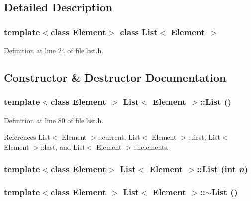 \subsection{Detailed Description}
\subsubsection*{template$<$class Element$>$ class List$<$ Element $>$}



Definition at line 24 of file list.h.

\subsection{Constructor \& Destructor Documentation}
\hypertarget{classList_cdfa9a2a43d22f973fe2ecc55318847a}{
\subsubsection[{List}]{\setlength{\rightskip}{0pt plus 5cm}template$<$class Element $>$ {\bf List}$<$ Element $>$::{\bf List} ()}}
\label{classList_cdfa9a2a43d22f973fe2ecc55318847a}




Definition at line 80 of file list.h.

References List$<$ Element $>$::current, List$<$ Element $>$::first, List$<$ Element $>$::last, and List$<$ Element $>$::nelements.\hypertarget{classList_2115cdf859728c641b7426ccd29036a5}{
\subsubsection[{List}]{\setlength{\rightskip}{0pt plus 5cm}template$<$class Element$>$ {\bf List}$<$ Element $>$::{\bf List} (int {\em n})}}
\label{classList_2115cdf859728c641b7426ccd29036a5}


\hypertarget{classList_d60d01b9c7003b77fd3370a7f3468a62}{
\subsubsection[{$\sim$List}]{\setlength{\rightskip}{0pt plus 5cm}template$<$class Element $>$ {\bf List}$<$ Element $>$::$\sim${\bf List} ()}}
\label{classList_d60d01b9c7003b77fd3370a7f3468a62}




